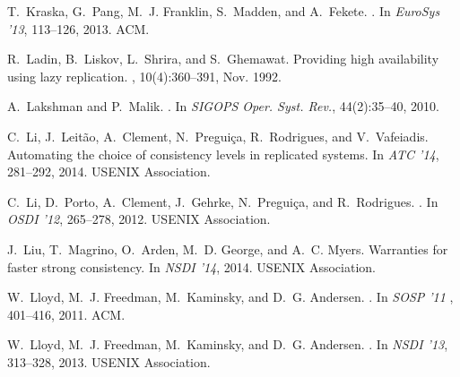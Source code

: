 \documentclass[11pt,dvipdfm]{article}
\begin{document}
\begin{thebibliography}{10}
\begin{small}
T.~Kraska, G.~Pang, M.~J. Franklin, S.~Madden, and A.~Fekete.
.
\newblock In {\em EuroSys '13}, 113--126, 2013. ACM.

R.~Ladin, B.~Liskov, L.~Shrira, and S.~Ghemawat.
\newblock Providing high availability using lazy replication.
, 10(4):360--391, Nov. 1992.

A.~Lakshman and P.~Malik.
.
\newblock In {\em SIGOPS Oper. Syst. Rev.}, 44(2):35--40, 2010.

C.~Li, J.~Leit{\~a}o, A.~Clement, N.~Pregui{\c c}a, R.~Rodrigues, and
  V.~Vafeiadis.
\newblock Automating the choice of consistency levels in replicated systems.
\newblock In {\em ATC '14},
  281--292, 2014. USENIX Association.

C.~Li, D.~Porto, A.~Clement, J.~Gehrke, N.~Pregui\c{c}a, and R.~Rodrigues.
.
\newblock In {\em OSDI '12}, 265--278, 2012. USENIX
  Association.


J.~Liu, T.~Magrino, O.~Arden, M.~D. George, and A.~C. Myers.
\newblock Warranties for faster strong consistency.
\newblock In { \em NSDI '14}, 2014. USENIX Association.

W.~Lloyd, M.~J. Freedman, M.~Kaminsky, and D.~G. Andersen.
.
\newblock In { \em SOSP  '11}
, 401--416, 2011. ACM.

W.~Lloyd, M.~J. Freedman, M.~Kaminsky, and D.~G. Andersen.
.
\newblock In {\em  NSDI '13}, 313--328, 2013. USENIX
  Association.


\end{small}
\end{thebibliography}
\end{document}

